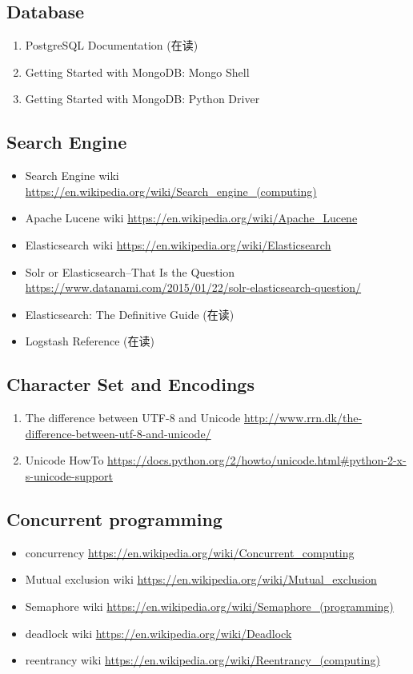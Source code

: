 \documentclass{article}
\begin{document}
\subsection{Database}
\begin{enumerate}
    \item PostgreSQL Documentation (在读)
    \item Getting Started with MongoDB: Mongo Shell
    \item Getting Started with MongoDB: Python Driver
\end{enumerate}
%
\subsection{Search Engine}
%
\begin{itemize}
    \item Search Engine wiki \url{https://en.wikipedia.org/wiki/Search_engine_(computing)}
    \item Apache Lucene wiki \url{https://en.wikipedia.org/wiki/Apache_Lucene}
    \item Elasticsearch wiki \url{https://en.wikipedia.org/wiki/Elasticsearch}
    \item Solr or Elasticsearch–That Is the Question \url{https://www.datanami.com/2015/01/22/solr-elasticsearch-question/}
    \item Elasticsearch: The Definitive Guide (在读)
    \item Logstash Reference (在读)
\end{itemize}
\subsection{Character Set and Encodings}
\begin{enumerate}
    \item The difference between UTF-8 and Unicode \url{http://www.rrn.dk/the-difference-between-utf-8-and-unicode/}
    \item Unicode HowTo \url{https://docs.python.org/2/howto/unicode.html#python-2-x-s-unicode-support}
\end{enumerate}
%
%
\subsection{Concurrent programming}
%
\begin{itemize}
    \item concurrency \url{https://en.wikipedia.org/wiki/Concurrent_computing}
    \item Mutual exclusion wiki \url{https://en.wikipedia.org/wiki/Mutual_exclusion}
    \item Semaphore wiki \url{https://en.wikipedia.org/wiki/Semaphore_(programming)}
    \item deadlock wiki \url{https://en.wikipedia.org/wiki/Deadlock}
    \item reentrancy wiki \url{https://en.wikipedia.org/wiki/Reentrancy_(computing)}
\end{itemize}
\end{document}
